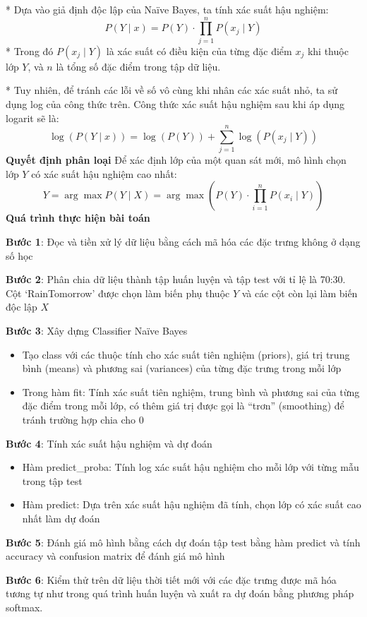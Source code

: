\documentclass[conference]{IEEEtran}
\begin{document}
* Dựa vào giả định độc lập của Naïve Bayes, ta tính xác suất hậu nghiệm:
\[
P(Y \mid x) = P(Y) \cdot \prod_{j=1}^{n} P(x_j \mid Y)
\]
* Trong đó \( P(x_j \mid Y) \) là xác suất có điều kiện của từng đặc điểm \( x_j \) khi thuộc lớp \( Y \), và \( n \) là tổng số đặc điểm trong tập dữ liệu.

* Tuy nhiên, để tránh các lỗi về số vô cùng khi nhân các xác suất nhỏ, ta sử dụng log của công thức trên. Công thức xác suất hậu nghiệm sau khi áp dụng logarit sẽ là:
\[
\log(P(Y \mid x)) = \log(P(Y)) + \sum_{j=1}^{n} \log \left( P(x_j \mid Y) \right)
\]
\textbf{Quyết định phân loại}
\indent Để xác định lớp của một quan sát mới, mô hình chọn lớp \( Y \) có xác suất hậu nghiệm cao nhất:
\[
Y = \arg \max P(Y \mid X) = \arg \max \left( P(Y) \cdot \prod_{i=1}^{n} P(x_i \mid Y) \right)
\]
\textbf{Quá trình thực hiện bài toán}

\noindent\textbf{Bước 1}: Đọc và tiền xử lý dữ liệu bằng cách mã hóa các đặc trưng không ở dạng số học

\noindent\textbf{Bước 2}: Phân chia dữ liệu thành tập huấn luyện và tập test với tỉ lệ là 70:30. Cột ‘RainTomorrow’ được chọn làm biến phụ thuộc \( Y \) và các cột còn lại làm biến độc lập \( X \)

\noindent\textbf{Bước 3}: Xây dựng Classifier Naïve Bayes
\begin{itemize}
    \item Tạo class với các thuộc tính cho xác suất tiên nghiệm (priors), giá trị trung bình (means) và phương sai (variances) của từng đặc trưng trong mỗi lớp
    \item Trong hàm fit: Tính xác suất tiên nghiệm, trung bình và phương sai của từng đặc điểm trong mỗi lớp, có thêm giá trị được gọi là “trơn” (smoothing) để tránh trường hợp chia cho 0
\end{itemize}

\noindent\textbf{Bước 4}: Tính xác suất hậu nghiệm và dự đoán
\begin{itemize}
    \item Hàm predict\_proba: Tính log xác suất hậu nghiệm cho mỗi lớp với từng mẫu trong tập test
    \item Hàm predict: Dựa trên xác suất hậu nghiệm đã tính, chọn lớp có xác suất cao nhất làm dự đoán
\end{itemize}

\noindent\textbf{Bước 5}: Đánh giá mô hình bằng cách dự đoán tập test bằng hàm predict và tính accuracy và confusion matrix để đánh giá mô hình

\noindent\textbf{Bước 6}: Kiểm thử trên dữ liệu thời tiết mới với các đặc trưng được mã hóa tương tự như trong quá trình huấn luyện và xuất ra dự đoán bằng phương pháp softmax.
\end{document}
